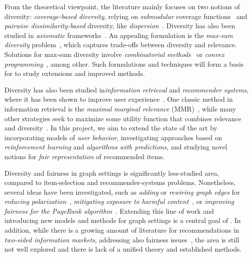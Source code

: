 \documentclass[a4paper,11pt]{article}
\begin{document}
From the theoretical viewpoint, the literature mainly focuses on two notions of diversity: 
\emph{coverage-based diversity}, relying on \emph{submodular} coverage functions~\cite{bach2013learning} 
and \emph{pairwise dissimilarity-based} diversity, like \emph{dispersion}~\cite{hassin1997approximation}.
Diversity has also been studied in \emph{axiomatic} frameworks~\cite{gollapudi2009axiomatic}. 
An appealing formulation is the \emph{max-sum diversity} problem~\cite{borodin2012max},
which captures trade-offs between diversity and relevance.
Solutions for max-sum diversity involve \emph{combinatorial methods}~\cite{borodin2012max} or
\emph{convex programming}~\cite{cevallos2016max}, 
among other.
Such formulations and techniques will form a basis for {\acronym}
to study extensions and improved methods. 


Diversity has also been studied in\emph{information retrieval} and \emph{recommender systems},
where it has been shown to improve user experience~\cite{Castells2022}.
One classic method in {information retrieval}
is the \emph{maximal marginal relevance} (MMR)~\cite{MMR}, 
while many other strategies seek to 
maximize some utility function that combines relevance and diversity~\cite{DUM,DPMF}.
In this project, we aim to extend the state of the art 
by incorporating models of \emph{user behavior}, 
investigating approaches based on \emph{reinforcement learning} and \emph{algorithms with predictions}, 
and studying novel notions for \emph{fair representation} of recommended items. 


Diversity and fairness in graph settings is significantly less-studied area,
compared to item-selection and recommender-systems problems.
Nonetheless, several ideas have been investigated, 
such as \emph{adding} or \emph{rewiring graph edges} for
\emph{reducing polarization}~\cite{adriaens2023minimizing,cinus2023rebalancing,haddadan2022reducing},
\emph{mitigating exposure to harmful content}~\cite{coupette2023reducing,fabbri2022rewiring}, 
or \emph{improving fairness for the Page\-Rank algorithm}~\cite{tsioutsiouliklis2022link}.
Extending this line of work and introducing new models and methods for graph settings
is a central goal of \acronym.
In addition, while there is a growing amount of literature for 
recommendations in \emph{two-sided information markets},
addressing also fairness issues~\cite{do2021two,wang2021user}, 
the area is still not well explored and there is lack of a unified theory
and established methods.
\end{document}

